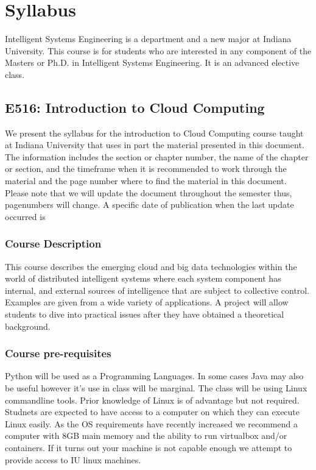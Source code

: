 \part{Syllabus}

Intelligent Systems Engineering is a department and a new major at
Indiana University. This course is for students who are interested in
any component of the Masters or Ph.D. in Intelligent Systems
Engineering. It is an advanced elective class.


\chapter{E516: Introduction to Cloud Computing}

We present the syllabus for the introduction to Cloud Computing course
taught at Indiana University that uses in part the material presented
in this document. The information includes the section or chapter
number, the name of the chapter or section, and the timeframe when it
is recommended to work through the material and the page number where
to find the material in this document. Please note that we will update
the document throughout the semester thus, pagenumbers will change. A
specific date of publication when the last update occurred is

\TODAY

\section{Course Description}

This course describes the emerging cloud and big data technologies
within the world of distributed intelligent systems where each system
component has internal, and external sources of intelligence that are
subject to collective control. Examples are given from a wide variety
of applications. A project will allow students to dive into practical
issues after they have obtained a theoretical background.

\section{Course pre-requisites}

Python will be used as a Programming Languages. In some cases Java may
also be useful however it's use in class will be marginal. The class
will be using Linux commandline tools. Prior knowledge of Linux is of
advantage but not required.  Studnets are expected to have access to a
computer on which they can execute Linux easily. As the OS
requirements have recently increased we recommend a computer with 8GB
main memory and the ability to run virtualbox and/or containers. If it
turns out your machine is not capable enough we attempt to provide
access to IU linux machines.

